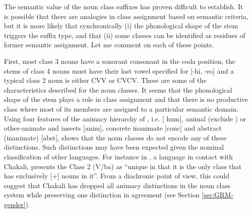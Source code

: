 \begin{exe}
\begin{exe}
\begin{exe}
\begin{exe}
\begin{exe}
\begin{exe}
The semantic value of the noun class suffixes has proven difficult to
establish. It is possible that there are analogies in class assignment based on semantic criteria, but it is more likely that synchronically (i) the phonological
shape of the stem triggers the suffix type, and that (ii) some classes can be
identified as residues of former semantic assignment. Let me comment on each of 
these
points. 

First, most class 3 nouns have  a sonorant consonant in the coda position,
the stems of  class 4 nouns must have their last vowel specified for  [{\sc -hi,
-ro}] and a typical class 2 noun is either   CVV or CVCV.  These are some of
the characteristics  described for the noun classes. It seems that the
phonological
shape of the stem plays a role in class assignment and that there is no
productive class
where most of its  members are assigned to a particular semantic domain.  Using
four features of the animacy hierarchy
of  \citet{Comr89}, i.e.   $[${\sc
hum}$]$, animal (exclude ) or other-animate
and insects $[${\sc anim}$]$, concrete inanimate $[${\sc conc}$]$ and abstract
(inanimate) $[${\sc abst}$]$,  \citet{brin08} shows that the noun
classes  do not encode any of these distinctions. Such
distinctions may have
been  expected given the nominal classification of other  languages. For
instance in , a  language in contact with
Chakali, \citet[124]{Bodo94} presents the Class 2 (V/ba) as ``unique in that it
is the only class that has exclusively [+] nouns in it''. From a
diachronic point of view, this could suggest that Chakali has dropped all animacy
distinctions in the noun class system while preserving one distinction in
agreement (see Section \ref{sec:GRM-gender}).



\end{exe}
\end{exe}
\end{exe}
\end{exe}
\end{exe}
\end{exe}
